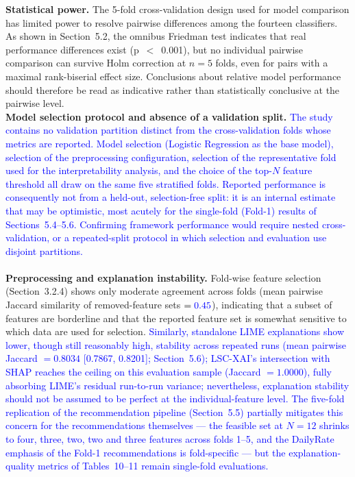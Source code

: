 \documentclass[a4paper,fleqn]{cas-sc}
\begin{document}
{\textbf{Statistical power.} The 5-fold cross-validation design used for model comparison has limited power to resolve pairwise differences among the fourteen classifiers. As shown in Section~5.2, the omnibus Friedman test indicates that real performance differences exist (p~$<$~0.001), but no individual pairwise comparison can survive Holm correction at $n=5$ folds, even for pairs with a maximal rank-biserial effect size. Conclusions about relative model performance should therefore be read as indicative rather than statistically conclusive
at the pairwise level.\\
\textbf{Model selection protocol and absence of a validation split.} \textcolor{blue}{The study contains no validation partition distinct from the cross-validation folds whose metrics are reported. Model selection (Logistic Regression as the base model), selection of the preprocessing configuration, selection of the representative fold used for the interpretability analysis, and the choice of the top-$N$ feature threshold all draw on the same five stratified folds. Reported performance is consequently not from a held-out, selection-free split: it is an internal estimate that may be optimistic, most acutely for the single-fold (Fold-1) results of Sections~5.4--5.6. Confirming framework performance would require nested cross-validation, or a repeated-split protocol in which selection and evaluation use disjoint partitions.}\\\\
\textbf{Preprocessing and explanation instability.} Fold-wise feature selection (Section~3.2.4) shows only moderate agreement across folds (mean pairwise Jaccard similarity of removed-feature sets $=\textcolor{blue}{0.45}$), indicating that a subset of features are borderline and that the reported feature
set is somewhat sensitive to which data are used for selection. \textcolor{blue}{Similarly, standalone LIME explanations show lower, though still reasonably high, stability across repeated runs (mean pairwise Jaccard $= 0.8034$ [0.7867, 0.8201]; Section~5.6); LSC-XAI's intersection with SHAP reaches the ceiling on this evaluation sample (Jaccard $= 1.0000$), fully absorbing LIME's residual run-to-run variance; nevertheless, explanation stability should not be assumed to be perfect at the individual-feature level. The five-fold replication of the recommendation pipeline (Section~5.5) partially mitigates this concern for the recommendations themselves --- the feasible set at $N = 12$ shrinks to four, three, two, two and three features across folds 1--5, and the DailyRate emphasis of the Fold-1 recommendations is fold-specific --- but the explanation-quality metrics of Tables~10--11 remain single-fold evaluations.}\\
}
\end{document}
